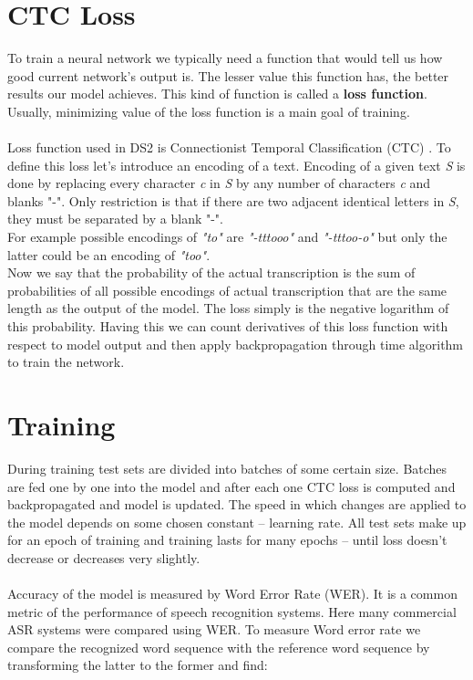 \documentclass[licencjacka,en]{pracamgr}
\begin{document}
\section{CTC Loss}
To train a neural network we typically need a function that would tell us how good current network's output is. The lesser value this function has, the better results our model achieves. This kind of function is called a \textbf{loss function}. Usually, minimizing value of the loss function is a main goal of training. \\\\
Loss function used in DS2 is Connectionist Temporal Classification (CTC) \cite{DS3}. To define this loss let's introduce an encoding of a text. Encoding of a given text \textit{S} is done by replacing every character \textit{c} in \textit{S} by any number of characters \textit{c} and blanks "-". Only restriction is that if there are two adjacent identical letters in \textit{S}, they must be separated by a blank "-".\\
For example possible encodings of \textit{"to"} are \textit{"-tttooo"} and \textit{"-tttoo-o"} but only the latter could be an encoding of \textit{"too"}.\\
Now we say that the probability of the actual transcription is the sum of probabilities of all possible encodings of actual transcription that are the same length as the output of the model. The loss simply is the negative logarithm of this probability. Having this we can count derivatives of this loss function with respect to model output and then apply backpropagation through time algorithm to train the network.

\section{Training}
During training test sets are divided into batches of some certain size. Batches are fed one by one into the model and after each one CTC loss is computed and backpropagated and model is updated. The speed in which changes are applied to the model depends on some chosen constant -- learning rate. All test sets make up for an epoch of training and training lasts for many epochs -- until loss doesn't decrease or decreases very slightly.\\\\
Accuracy of the model is measured by Word Error Rate (WER). It is a common metric of the performance of speech recognition systems. Here \cite{DS8} many commercial ASR systems were compared using WER. To measure Word error rate we compare the recognized word sequence with the reference word sequence by transforming the latter to the former and find:
\end{document}
